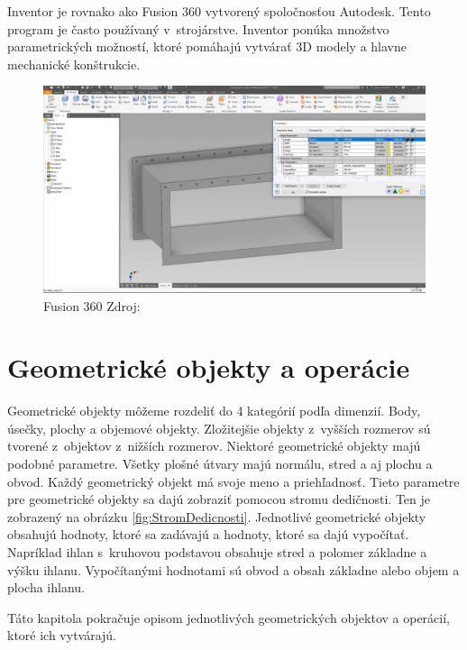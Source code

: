 Inventor je rovnako ako Fusion 360 vytvorený spoločnosťou Autodesk. Tento program je často používaný v~strojárstve. Inventor ponúka množstvo parametrických možností, ktoré pomáhajú vytvárať 3D modely a hlavne mechanické konštrukcie.


\begin{figure}[H]
    \centering
    \includegraphics[width = 0.5\linewidth]{obrazky-figures/programs/Inventor.png}
    \caption{Fusion 360 Zdroj: \cite{cadline_2017} }
    \label{fig:Inventor}
\end{figure}


\chapter{Geometrické objekty a operácie}
\label{chapt:Geometrické_tvary}

Geometrické objekty môžeme rozdeliť do 4 kategórií podľa dimenzií. Body, úsečky, plochy a objemové objekty.
Zložitejšie objekty z~vyšších rozmerov sú tvorené z~objektov z~nižších rozmerov. 
Niektoré geometrické objekty majú podobné parametre. Všetky plošné útvary majú normálu, stred a aj plochu a obvod. Každý geometrický objekt má svoje meno a priehľadnosť. Tieto parametre pre geometrické objekty sa dajú zobraziť pomocou stromu dedičnosti. Ten je zobrazený na obrázku \ref{fig:StromDedicnosti}. 
Jednotlivé geometrické objekty obsahujú hodnoty, ktoré sa zadávajú a hodnoty, ktoré sa dajú vypočítať. Napríklad ihlan s~kruhovou podstavou obsahuje stred a polomer základne a výšku ihlanu. Vypočítanými hodnotami sú obvod a obsah základne alebo objem a plocha ihlanu.  

Táto kapitola pokračuje opisom jednotlivých geometrických objektov a operácií, ktoré ich vytvárajú.

